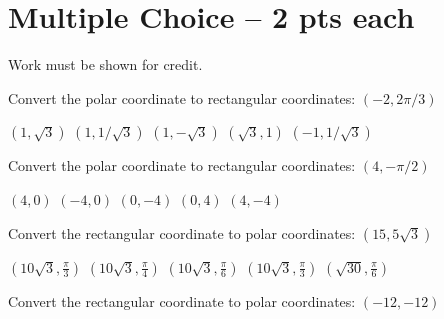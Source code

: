 \documentclass[11pt]{exam}
\begin{document}
\section*{Multiple Choice -- 2 pts each}
{\large Work must be shown for credit.}
\vspace{2ex}
\begin{questions}
	\begin{minipage}{\linewidth}
		\question Convert the polar coordinate to rectangular coordinates: $(-2, 2\pi/3)$

\begin{choices}
	\choice $\left(1,\sqrt{3}\right)$
	\choice $\left(1,1/\sqrt{3}\right)$
	\CorrectChoice $\left(1,-\sqrt{3}\right)$
	\choice $\left(\sqrt{3},1\right)$
	\choice $\left(-1,1/\sqrt{3}\right)$

\end{choices} \answerline
\end{minipage}

\begin{minipage}{\linewidth}
\question Convert the polar coordinate to rectangular coordinates: $(4,-\pi/2)$

\begin{choices}
	\choice $\left(4,0\right)$
	\choice $\left(-4,0\right)$
	\CorrectChoice $\left(0,-4\right)$
	\choice $\left(0,4\right)$
	\choice $\left(4,-4\right)$
\end{choices} \answerline
\end{minipage}

\begin{minipage}{\linewidth}



\question Convert the rectangular coordinate to polar coordinates: $(15, 5\sqrt{3})$

\begin{choices}
	\choice $\left(10 \sqrt{3},\frac{\pi }{3}\right)$
	\choice $\left(10 \sqrt{3},\frac{\pi }{4}\right)$
	\CorrectChoice $\left(10 \sqrt{3},\frac{\pi }{6}\right)$
	\choice $\left(10 \sqrt{3},\frac{\pi }{3}\right)$
	\choice $\left(\sqrt{30},\frac{\pi }{6}\right)$

\end{choices} \answerline
\end{minipage}

\begin{minipage}{\linewidth}



\question Convert the rectangular coordinate to polar coordinates: $(-12, -12)$


\end{minipage}
\end{questions}
\end{document}
